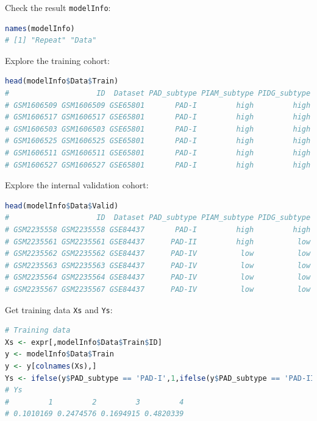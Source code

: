 \documentclass[
  12pt,
]{book}
\newcommand{\passthrough}[1]{#1}
\begin{document}
Check the result \passthrough{\lstinline!modelInfo!}:

\begin{lstlisting}[language=R]
names(modelInfo)
# [1] "Repeat" "Data"
\end{lstlisting}

Explore the training cohort:

\begin{lstlisting}[language=R]
head(modelInfo$Data$Train)
#                    ID  Dataset PAD_subtype PIAM_subtype PIDG_subtype platform
# GSM1606509 GSM1606509 GSE65801       PAD-I         high         high GPL14550
# GSM1606517 GSM1606517 GSE65801       PAD-I         high         high GPL14550
# GSM1606503 GSM1606503 GSE65801       PAD-I         high         high GPL14550
# GSM1606525 GSM1606525 GSE65801       PAD-I         high         high GPL14550
# GSM1606511 GSM1606511 GSE65801       PAD-I         high         high GPL14550
# GSM1606527 GSM1606527 GSE65801       PAD-I         high         high GPL14550
\end{lstlisting}

Explore the internal validation cohort:

\begin{lstlisting}[language=R]
head(modelInfo$Data$Valid)
#                    ID  Dataset PAD_subtype PIAM_subtype PIDG_subtype platform
# GSM2235558 GSM2235558 GSE84437       PAD-I         high         high  GPL6947
# GSM2235561 GSM2235561 GSE84437      PAD-II         high          low  GPL6947
# GSM2235562 GSM2235562 GSE84437      PAD-IV          low          low  GPL6947
# GSM2235563 GSM2235563 GSE84437      PAD-IV          low          low  GPL6947
# GSM2235564 GSM2235564 GSE84437      PAD-IV          low          low  GPL6947
# GSM2235567 GSM2235567 GSE84437      PAD-IV          low          low  GPL6947
\end{lstlisting}

Get training data \passthrough{\lstinline!Xs!} and \passthrough{\lstinline!Ys!}:

\begin{lstlisting}[language=R]
# Training data
Xs <- expr[,modelInfo$Data$Train$ID]
y <- modelInfo$Data$Train
y <- y[colnames(Xs),]
Ys <- ifelse(y$PAD_subtype == 'PAD-I',1,ifelse(y$PAD_subtype == 'PAD-II',2,ifelse(y$PAD_subtype == 'PAD-III',3,ifelse(y$PAD_subtype == 'PAD-IV',4,NA)))); table(Ys)/length(Ys)
# Ys
#         1         2         3         4 
# 0.1010169 0.2474576 0.1694915 0.4820339
\end{lstlisting}
\end{document}
